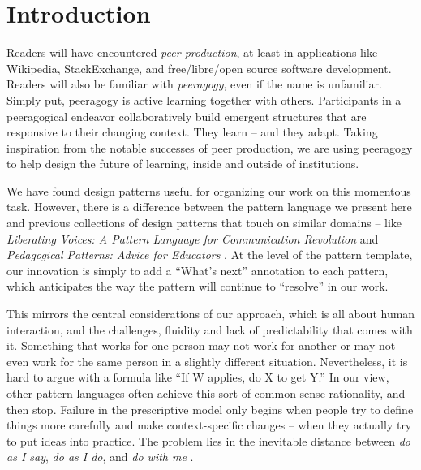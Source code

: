 
\section{Introduction}\label{sec:Introduction}


Readers will have encountered \emph{peer production}, at least in applications like Wikipedia, StackExchange, and free/libre/open source software development.   
%
Readers will also be familiar with \emph{peeragogy}, even if the name is unfamiliar.  Simply put, peeragogy is active learning together with others.  Participants in a peeragogical endeavor collaboratively build emergent structures that are responsive to their changing context. They learn -- and they adapt.
%
Taking inspiration from the notable successes of peer production, we are using peeragogy to help design the future of learning, inside and outside of institutions.

We have found design patterns useful for organizing our work on this momentous task.  However, there is a difference between the pattern language we present here and previous collections of design patterns that touch on similar domains -- like \emph{Liberating Voices: A Pattern Language for Communication Revolution} \cite{schuler2008liberating} and \emph{Pedagogical Patterns: Advice for Educators} \cite{bergin2012pedagogical}.  At the level of the pattern template, our innovation is simply to add a ``What's next'' annotation to each pattern, which anticipates the way the pattern will continue to ``resolve'' in our work. 


This mirrors the central considerations of our approach, which is all about human interaction, and the challenges, fluidity and lack of predictability that comes with it.  Something that works for one person may not work for another or may not even work for the same person in a slightly different situation.  Nevertheless, it is hard to argue with a formula like ``If W applies, do X to get Y.'' In our view, other pattern languages often achieve this sort of common sense rationality, and then stop.  Failure in the prescriptive model only begins when people try to define things more carefully and make context-specific changes -- when they actually try to put ideas into practice.  The problem lies in the inevitable distance between \emph{do as I say}, \emph{do as I do}, and \emph{do with me} \cite[p.~26]{deleuze1994difference}.

